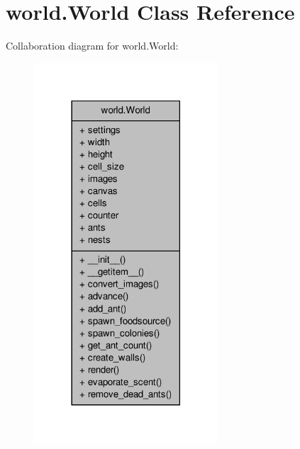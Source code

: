 \hypertarget{classworld_1_1World}{\section{world.\+World Class Reference}
\label{classworld_1_1World}
}


Collaboration diagram for world.\+World\+:
\nopagebreak
\begin{figure}[H]
\begin{center}
\leavevmode
\includegraphics[width=194pt]{classworld_1_1World__coll__graph}
\end{center}
\end{figure}

